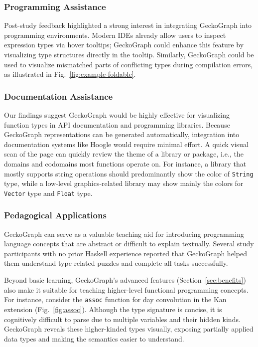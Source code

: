 \documentclass[preprint,12pt]{elsarticle}
\begin{document}
\subsubsection{Programming Assistance}
Post-study feedback highlighted a strong interest in integrating GeckoGraph into programming environments. 
Modern IDEs already allow users to inspect expression types via hover tooltips; GeckoGraph could enhance this feature by visualizing type structures directly in the tooltip. 
Similarly, GeckoGraph could be used to visualize mismatched parts of conflicting types during compilation errors, as illustrated in Fig.~\ref{fig:example-foldable}.

\subsubsection{Documentation Assistance}
Our findings suggest GeckoGraph would be highly effective for visualizing function types in API documentation and programming libraries. 
Because GeckoGraph representations can be generated automatically, integration into documentation systems like Hoogle \cite{Mitchell_undated-fb} would require minimal effort. 
A quick visual scan of the page can quickly review the theme of a library or package, i.e., the domains and codomains most functions operate on. For instance, a library that mostly supports string operations should predominantly show the color of {\tt String} type, while a low-level graphics-related library may show mainly the colors for {\tt Vector} type and {\tt Float} type.

\subsubsection{Pedagogical Applications}
GeckoGraph can serve as a valuable teaching aid for introducing programming language concepts that are abstract or difficult to explain textually. 
Several study participants with no prior Haskell experience reported that GeckoGraph helped them understand type-related puzzles and complete all tasks successfully. 

Beyond basic learning, GeckoGraph’s advanced features (Section~\ref{sec:benefits}) also make it suitable for teaching higher-level functional programming concepts. 
For instance, consider the \texttt{assoc} function for day convolution \cite{Day1970-kb} in the Kan extension (Fig.~\ref{fig:assoc}). 
Although the type signature is concise, it is cognitively difficult to parse due to multiple variables and their hidden kinds. 
GeckoGraph reveals these higher-kinded types visually, exposing partially applied data types and making the semantics easier to understand.
\end{document}
